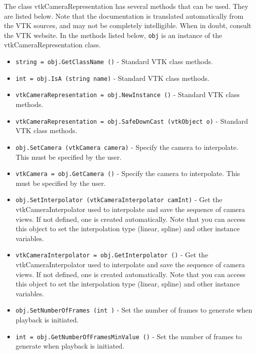 The class vtkCameraRepresentation has several methods that can be used.
  They are listed below.
Note that the documentation is translated automatically from the VTK sources,
and may not be completely intelligible.  When in doubt, consult the VTK website.
In the methods listed below, \verb|obj| is an instance of the vtkCameraRepresentation class.
\begin{itemize}
\item  \verb|string = obj.GetClassName ()| -  Standard VTK class methods.

\item  \verb|int = obj.IsA (string name)| -  Standard VTK class methods.

\item  \verb|vtkCameraRepresentation = obj.NewInstance ()| -  Standard VTK class methods.

\item  \verb|vtkCameraRepresentation = obj.SafeDownCast (vtkObject o)| -  Standard VTK class methods.

\item  \verb|obj.SetCamera (vtkCamera camera)| -  Specify the camera to interpolate. This must be specified by
 the user.

\item  \verb|vtkCamera = obj.GetCamera ()| -  Specify the camera to interpolate. This must be specified by
 the user.

\item  \verb|obj.SetInterpolator (vtkCameraInterpolator camInt)| -  Get the vtkCameraInterpolator used to interpolate and save the
 sequence of camera views. If not defined, one is created
 automatically. Note that you can access this object to set
 the interpolation type (linear, spline) and other instance
 variables.

\item  \verb|vtkCameraInterpolator = obj.GetInterpolator ()| -  Get the vtkCameraInterpolator used to interpolate and save the
 sequence of camera views. If not defined, one is created
 automatically. Note that you can access this object to set
 the interpolation type (linear, spline) and other instance
 variables.

\item  \verb|obj.SetNumberOfFrames (int )| -  Set the number of frames to generate when playback is initiated.

\item  \verb|int = obj.GetNumberOfFramesMinValue ()| -  Set the number of frames to generate when playback is initiated.


\end{itemize}

